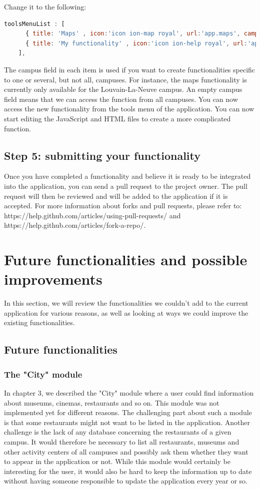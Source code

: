 \documentclass{eplmastersthesis}
\begin{document}
Change it to the following:
\begin{lstlisting}[language=JavaScript]
   toolsMenuList : [
      { title: 'Maps' , icon:'icon ion-map royal', url:'app.maps', campus:['Louvain-la-Neuve']},
      { title: 'My functionality' , icon:'icon ion-help royal', url:'app.myfunctionality', campus:[]}
    ],
\end{lstlisting}
The campus field in each item is used if you want to create functionalities specific to one or several, but not all, campuses. For instance, the maps functionality is currently only available for the Louvain-La-Neuve campus. An empty campus field means that we can access the function from all campuses.
You can now access the new functionality from the tools menu of the application. You can now start editing the JavaScript and HTML files to create a more complicated function.
\subsection{Step 5: submitting your functionality}
Once you have completed a functionality and believe it is ready to be integrated into the application, you can send a pull request to the project owner. The pull request will then be reviewed and will be added to the application if it is accepted. For more information about forks and pull requests, please refer to: https://help.github.com/articles/using-pull-requests/ and https://help.github.com/articles/fork-a-repo/.
\section{Future functionalities and possible improvements}
In this section, we will review the functionalities we couldn't add to the current application for various reasons, as well as looking at ways we could improve the existing functionalities.
\subsection{Future functionalities}
\subsubsection{The "City" module}
In chapter 3, we described the "City" module where a user could find information about museums, cinemas, restaurants and so on. This module was not implemented yet for different reasons. The challenging part about such a module is that some restaurants might not want to be listed in the application. Another challenge is the lack of any database concerning the restaurants of a given campus. It would therefore be necessary to list all restaurants, museums and other activity centers of all campuses and possibly ask them whether they want to appear in the application or not.
While this module would certainly be interesting for the user, it would also be hard to keep the information up to date without having someone responsible to update the application every year or so.
\end{document}
